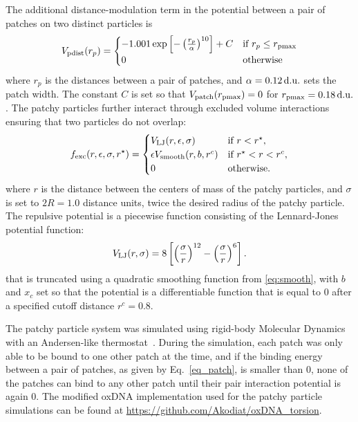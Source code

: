 The additional distance-modulation term in the potential between a pair of patches on two distinct particles is 
\begin{equation}
    \label{eq_patch}
    V_{\rm pdist}(r_p) =  \begin{cases} 
                          -1.001  \exp{\left[- \left( \frac{r_p}{\alpha} \right)^{10}\right]} + C & \text{if $r_p \leq r_{\rm pmax}  $} \\
                          0 & \text{otherwise}
                        \end{cases}
\end{equation}
where $r_p$ is the distances between a pair of patches, and $\alpha = 0.12\, {\rm d.u.}$ sets the patch width. The constant $C$ is set so that $V_{\rm patch}(r_{\rm pmax}) = 0$ for $r_{\rm pmax} = 0.18\, \rm{d.u.}$. The patchy particles further interact through excluded volume interactions ensuring that two particles do not overlap:
\begin{equation}
    f_{\rm exc}(r,\epsilon,\sigma,r^{\star}) = \begin{cases}
	V_{\rm LJ}(r, \epsilon, \sigma) & \text{if $r < r^{\star} $},\\
	\epsilon V_{\rm smooth} (r, b, r^c) & \text{if $r^{\star} < r < r^c$},\\
	0 & \text{otherwise}.
	\end{cases} 
\end{equation}
where $r$ is the distance between the centers of mass of the patchy particles, and $\sigma$ is set to $2R = 1.0$ distance units, twice the desired radius of the patchy particle.
The repulsive potential is a piecewise function consisting of the Lennard-Jones potential function:
\begin{equation} 
V_{\rm LJ}(r,  \sigma) = 8 \left[ \left(\frac{\sigma}{r}\right) ^{12} - \left(\frac{\sigma}{r}\right) ^{6} \right].
\end{equation}
that is truncated using a quadratic smoothing function from \eqref{eq:smooth}, with $b$ and $x_c$ set so that the potential is a differentiable function that is equal to $0$ after a specified cutoff distance $r^c = 0.8$.  

The patchy particle system was simulated using rigid-body Molecular Dynamics with an Andersen-like thermostat~\cite{russo2009reversible}. During the simulation, each patch was only able to be bound to one other patch at the time, and if the binding energy between a pair of patches, as given by Eq.~\eqref{eq_patch}, is smaller than 0, none of the patches can bind to any other patch until their pair interaction potential is again 0.
The modified oxDNA implementation used for the patchy particle simulations can be found at \href{https://github.com/Akodiat/oxDNA_torsion}{https://github.com/Akodiat/oxDNA\_torsion}.


